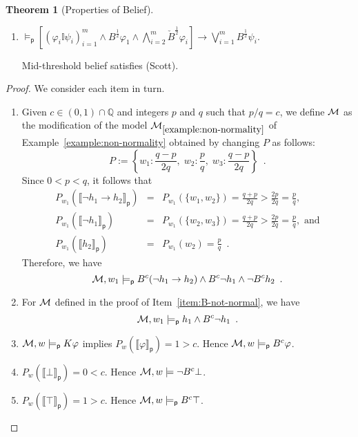 \documentclass[12pt]{article}
\theoremstyle{definition}
\newtheorem{theorem}{Theorem}[section]
\newcommand{\Rat}{\mathbb{Q}}  %
\newcommand{\M}{{\cal M}}      %
\newcommand{\modelsp}{\models_{\mathsf{p}}}                  %
\newcommand{\semp}[1]{\llbracket{#1}\rrbracket_{\mathsf{p}}} %
\begin{document}
\begin{theorem}[Properties of Belief]
\begin{enumerate}
    For mid-threshold belief, if $\varphi$ is consistent with the agent's
    beliefs and $\lnot\varphi\land\psi$ is consistent with her knowledge,
    then she believes $\varphi\lor\psi$.

  \item \label{item:B-Len}
    $ \textstyle \modelsp [(\varphi_i\mathbb{I}\psi_i)_{i=1}^m \land
    B^{\frac 12}\varphi_1 \land \bigwedge_{i=2}^m \check B^{\frac
      12}\varphi_i] \to \bigvee_{i=1}^m B^{\frac 12}\psi_i $.

    Mid-threshold belief satisfies (Scott).
  \end{enumerate}
\end{theorem}
\begin{proof}
  We consider each item in turn.
  \begin{enumerate}
  \item Given $c\in(0,1)\cap\Rat$ and integers $p$ and $q$ such that
    $p/q=c$, we define $\M$ as the modification of the model
    $\M_{\ref{example:non-normality}}$ of
    Example~\ref{example:non-normality} obtained by changing $P$ as
    follows:
    \[
    P := \left\{ w_1:\frac{q-p}{2q},\; w_2:\frac pq,\;
      w_3:\frac{q-p}{2q} \right\}\enspace.
    \]
    Since $0<p<q$, it follows that
    \begin{eqnarray*}
      P_{w_1}(\semp{\lnot h_1\to h_2}) &=&
      P_{w_1}(\{w_1,w_2\}) =
      \frac{q+p}{2q}>\frac {2p}{2q}=\frac pq,
      \\
      P_{w_1}(\semp{\lnot h_1}) &=&
      P_{w_1}(\{w_2,w_3\}) = \frac{q+p}{2q}>\frac {2p}{2q}
                                    =\frac pq,\text{ and}
      \\
      P_{w_1}(\semp{h_2})&=& 
      P_{w_1}(w_2) = \frac pq\enspace.
    \end{eqnarray*}
    Therefore, we have
    \[
    \M,w_1\modelsp B^c(\lnot h_1\to h_2)\land B^c\lnot h_1\land \lnot
    B^ch_2\enspace.
    \]
    
  \item For $\M$ defined in the proof of Item~\ref{item:B-not-normal},
    we have
    \[
    \M,w_1\modelsp h_1\land B^c\lnot h_1\enspace.
    \]
    
  \item $\M,w\modelsp K\varphi$ implies $P_w(\semp{\varphi})=1 > c$.
    Hence $\M,w\modelsp B^c\varphi$.

  \item $P_w(\semp{\bot})=0<c$.  Hence
    $\M,w\models\lnot B^c\bot$.

  \item $P_w(\semp{\top})=1>c$. Hence $\M,w\modelsp B^c\top$.


\end{enumerate}
\end{proof}
\end{document}
